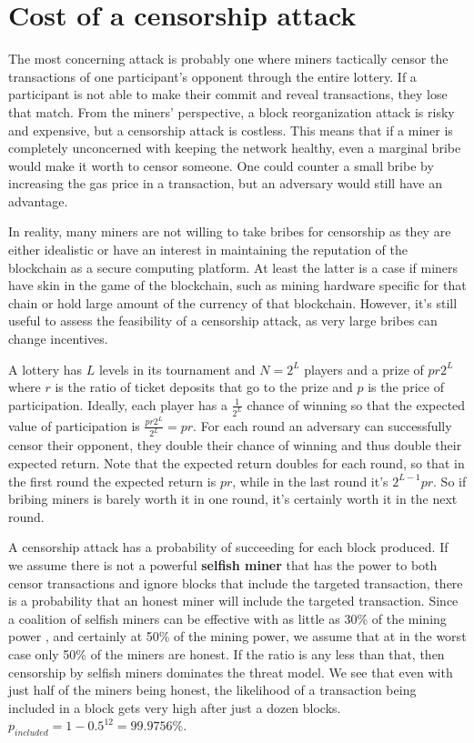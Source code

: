 \section{Cost of a censorship attack}
\label{sec:censorship}

The most concerning attack is probably one where miners tactically censor the transactions of one participant's opponent through the entire lottery. If a participant is not able to make their commit and reveal transactions, they lose that match. From the miners' perspective, a block reorganization attack is risky and expensive, but a censorship attack is costless. This means that if a miner is completely unconcerned with keeping the network healthy, even a marginal bribe would make it worth to censor someone. One could counter a small bribe by increasing the gas price in a transaction, but an adversary would still have an advantage. 

In reality, many miners are not willing to take bribes for censorship as they are either idealistic or have an interest in maintaining the reputation of the blockchain as a secure computing platform. At least the latter is a case if miners have skin in the game of the blockchain, such as mining hardware specific for that chain or hold large amount of the currency of that blockchain. However, it's still useful to assess the feasibility of a censorship attack, as very large bribes can change incentives. 

A lottery has $L$ levels in its tournament and $N=2^L$ players and a prize of $pr2^L$ where $r$ is the ratio of ticket deposits that go to the prize and $p$ is the price of participation. Ideally, each player has a $\frac{1}{2^L}$ chance of winning so that the expected value of participation is $\frac{pr2^L}{2^L}=pr$. For each round an adversary can successfully censor their opponent, they double their chance of winning and thus double their expected return. Note that the expected return doubles for each round, so that in the first round the expected return is $pr$, while in the last round it's $2^{L-1}pr$. So if bribing miners is barely worth it in one round, it's certainly worth it in the next round.

A censorship attack has a probability of succeeding for each block produced. If we assume there is not a powerful \textbf{selfish miner} that has the power to both censor transactions and ignore blocks that include the targeted transaction, there is a probability that an honest miner will include the targeted transaction. Since a coalition of selfish miners can be effective with as little as 30\% of the mining power \cite{eyal_majority_2018}, and certainly at 50\% of the mining power, we assume that at in the worst case only 50\% of the miners are honest. If the ratio is any less than that, then censorship by selfish miners dominates the threat model. We see that even with just half of the miners being honest, the likelihood of a transaction being included in a block gets very high after just a dozen blocks. $p_{included} = 1-0.5^{12}=99.9756\%$.

